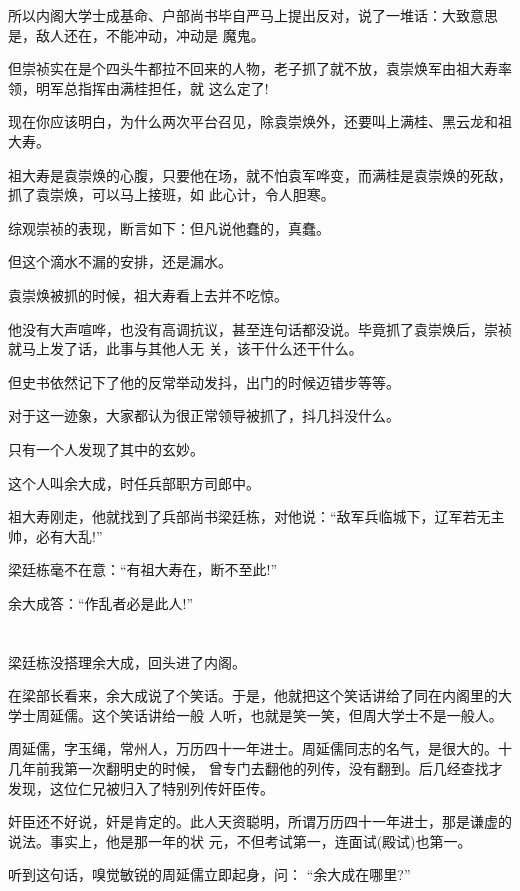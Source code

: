 \documentclass[11pt,a4paper,onecolumn]{article}
\begin{document}
所以内阁大学士成基命、户部尚书毕自严马上提出反对，说了一堆话：大致意思是，敌人还在，不能冲动，冲动是
魔鬼。

但崇祯实在是个四头牛都拉不回来的人物，老子抓了就不放，袁崇焕军由祖大寿率领，明军总指挥由满桂担任，就
这么定了!

现在你应该明白，为什么两次平台召见，除袁崇焕外，还要叫上满桂、黑云龙和祖大寿。

祖大寿是袁崇焕的心腹，只要他在场，就不怕袁军哗变，而满桂是袁崇焕的死敌，抓了袁崇焕，可以马上接班，如
此心计，令人胆寒。

综观崇祯的表现，断言如下：但凡说他蠢的，真蠢。

但这个滴水不漏的安排，还是漏水。

袁崇焕被抓的时候，祖大寿看上去并不吃惊。

他没有大声喧哗，也没有高调抗议，甚至连句话都没说。毕竟抓了袁崇焕后，崇祯就马上发了话，此事与其他人无
关，该干什么还干什么。

但史书依然记下了他的反常举动\myrule 发抖，出门的时候迈错步等等。

对于这一迹象，大家都认为很正常\myrule 领导被抓了，抖几抖没什么。

只有一个人发现了其中的玄妙。

这个人叫余大成，时任兵部职方司郎中。

祖大寿刚走，他就找到了兵部尚书梁廷栋，对他说：``敌军兵临城下，辽军若无主帅，必有大乱!''

梁廷栋毫不在意：``有祖大寿在，断不至此!''

余大成答：``作乱者必是此人!''

\section[\thesection]{}

梁廷栋没搭理余大成，回头进了内阁。

在梁部长看来，余大成说了个笑话。于是，他就把这个笑话讲给了同在内阁里的大学士周延儒。这个笑话讲给一般
人听，也就是笑一笑，但周大学士不是一般人。

周延儒，字玉绳，常州人，万历四十一年进士。周延儒同志的名气，是很大的。十几年前我第一次翻明史的时候，
曾专门去翻他的列传，没有翻到。后几经查找才发现，这位仁兄被归入了特别列传\myrule 奸臣传。

奸臣还不好说，奸是肯定的。此人天资聪明，所谓万历四十一年进士，那是谦虚的说法。事实上，他是那一年的状
元，不但考试第一，连面试(殿试)也第一。

听到这句话，嗅觉敏锐的周延儒立即起身，问： ``余大成在哪里?''
\end{document}

